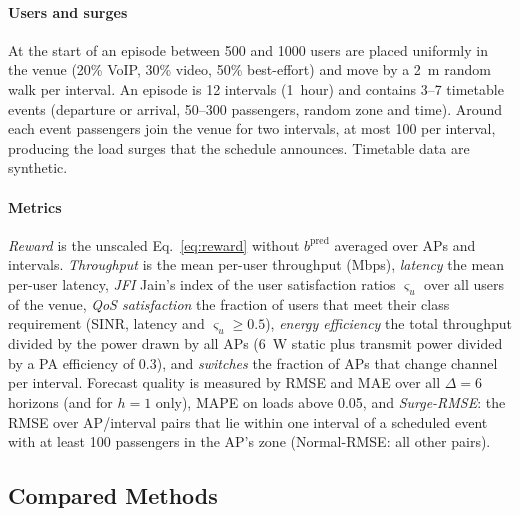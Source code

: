 \paragraph{Users and surges} At the start of an episode between 500 and 1000 users are placed uniformly in the venue (20\% VoIP, 30\% video, 50\% best-effort) and move by a 2~m random walk per interval. An episode is 12 intervals (1~hour) and contains 3--7 timetable events (departure or arrival, 50--300 passengers, random zone and time). Around each event passengers join the venue for two intervals, at most 100 per interval, producing the load surges that the schedule announces. Timetable data are synthetic.

\paragraph{Metrics} \emph{Reward} is the unscaled Eq.~\eqref{eq:reward} without $b^{\mathrm{pred}}$ averaged over APs and intervals. \emph{Throughput} is the mean per-user throughput (Mbps), \emph{latency} the mean per-user latency, \emph{JFI} Jain's index of the user satisfaction ratios $\varsigma_u$ over all users of the venue, \emph{QoS satisfaction} the fraction of users that meet their class requirement (SINR, latency and $\varsigma_u\ge0.5$), \emph{energy efficiency} the total throughput divided by the power drawn by all APs ($6$~W static plus transmit power divided by a PA efficiency of $0.3$), and \emph{switches} the fraction of APs that change channel per interval. Forecast quality is measured by RMSE and MAE over all $\Delta=6$ horizons (and for $h=1$ only), MAPE on loads above 0.05, and \emph{Surge-RMSE}: the RMSE over AP/interval pairs that lie within one interval of a scheduled event with at least 100 passengers in the AP's zone (Normal-RMSE: all other pairs).

\subsection{Compared Methods}
\label{sec:baselines}


